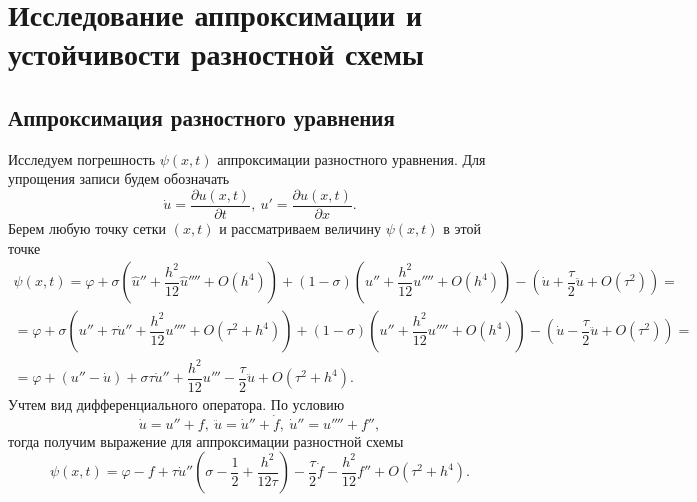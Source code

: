 \documentclass[a4paper, 12pt]{article}
\renewcommand{\d}{\partial}
\begin{document}
    	\section*{Исследование аппроксимации и устойчивости разностной схемы}
    	\subsection*{Аппроксимация разностного уравнения}
    	Исследуем погрешность $\psi(x,t)$ аппроксимации разностного уравнения.
    	Для упрощения записи будем обозначать
    	$$\dot u = \dfrac{\d u(x,t)}{\d t},\ u' =\dfrac{\d u(x,t)}{\d x}.$$ 
    	Берем любую точку сетки $(x,t)$ и рассматриваем величину $\psi(x,t)$ в этой точке
    	\begin{multline*}
    		\psi(x,t) = \varphi + \sigma \left(\hat u '' + \dfrac{h^2}{12}\hat u '''' + O(h^4) \right) + (1-\sigma)\left(u'' + \dfrac {h^2}{12} u'''' + O(h^4)\right) - \left(\dot u + \dfrac \tau 2 \ddot u + O(\tau^2) \right)=\\
    		= \varphi + \sigma \left(u'' + \tau \dot u '' + \dfrac {h^2}{12} u'''' + O(\tau^2 + h^4)\right) + (1-\sigma) \left(u'' + \dfrac{h^2}{12} u'''' + O(h^4)\right) - (\dot u - \dfrac \tau 2 \ddot u + O(\tau^2)) = \\=
    		\varphi + (u'' - \dot u) + \sigma \tau \dot u '' + \dfrac {h^2}{12} u''' - \dfrac \tau 2 \ddot u + O(\tau^2 + h^4).
    	\end{multline*}
    	Учтем вид дифференциального оператора. По условию
    	$$\dot u = u'' + f,\ \ddot u = \dot u '' + \dot f,\ \dot u '' = u'''' + f'',$$
    	тогда получим выражение для аппроксимации разностной схемы
    	$$\psi(x,t) = \varphi - f + \tau \dot u''\left(\sigma - \dfrac 12 + \dfrac {h^2}{12\tau}\right) - \dfrac \tau 2 \dot f - \dfrac{h^2}{12}f'' + O(\tau^2 + h^4).$$
\end{document}
